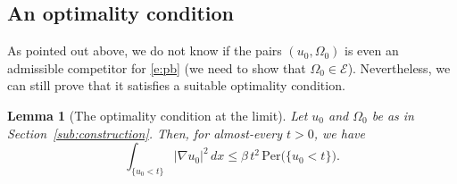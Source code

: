 \documentclass[JEP,XML,SOM,Unicode]{cedram}
\newcommand{\Per}{\mathrm{Per}}
\theoremstyle{plain}
\newtheorem{lemma}[teo]{Lemma}
\theoremstyle{definition}
\begin{document}
\subsection{An optimality condition}
As pointed out above, we do not know if the pairs $(u_0,\Omega_0)$ is even an admissible competitor for \eqref{e:pb} (we need to show that $\Omega_0\in \mathcal E$). Nevertheless, we can still prove that it satisfies a suitable optimality condition.
\begin{lemma}[The optimality condition at the limit]\label{l:opt_cond}
Let $u_0$ and $\Omega_0$ be as in Section~\ref{sub:construction}. Then, for almost-every $t>0$, we have
\begin{equation}\label{e:opt_cond}
\int_{\{u_0<t\}}|\nabla u_0|^2\,dx\le \beta\, t^2\, \Per\big(\{u_0<t\}\big).
\end{equation}
\end{lemma}
\end{document}

